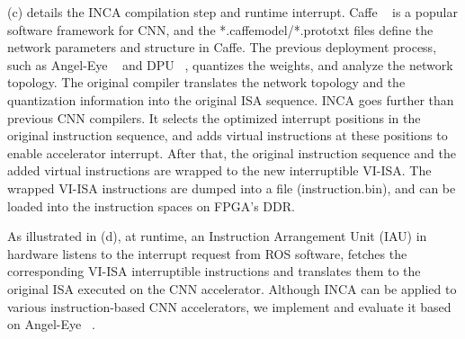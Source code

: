 (c) details the INCA compilation step and runtime interrupt. Caffe  ~\cite{jia2014caffe} is a popular software framework for CNN, and the *.caffemodel/*.prototxt files define the network parameters and structure in Caffe. The previous deployment process, such as Angel-Eye  ~\cite{guo2017angel} and DPU ~\cite{dpu}, quantizes the weights, and analyze the network topology. The original compiler translates the network topology and the quantization information into the original ISA sequence. INCA goes further than previous CNN compilers. It selects the optimized interrupt positions in the original instruction sequence, and adds virtual instructions at these positions to enable accelerator interrupt. After that, the original instruction sequence and the added virtual instructions are wrapped to the new interruptible VI-ISA. The wrapped VI-ISA instructions are dumped into a file (instruction.bin), and can be loaded into the instruction spaces on FPGA's DDR.


As illustrated in (d), at runtime, an Instruction Arrangement Unit (IAU) in hardware listens to the interrupt request from ROS software, fetches the corresponding VI-ISA interruptible instructions and translates them to the original ISA executed on the CNN accelerator. 
Although INCA can be applied to various instruction-based CNN accelerators, we implement and evaluate it based on Angel-Eye  ~\cite{guo2017angel}.


